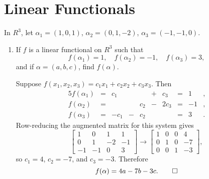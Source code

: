 \section{Linear Functionals}

 In $R^3$, let $\alpha_1 = (1, 0, 1)$,
$\alpha_2 = (0, 1, -2)$, $\alpha_3 = (-1, -1, 0)$.
\begin{enumerate}
\item If $f$ is a linear functional on $R^3$ such that
  \begin{equation*}
    f(\alpha_1) = 1, \quad
    f(\alpha_2) = -1, \quad
    f(\alpha_3) = 3,
  \end{equation*}
  and if $\alpha = (a, b, c)$, find $f(\alpha)$.
  \begin{solution}
    Suppose $f(x_1,x_2,x_3) = c_1x_1 + c_2x_2 + c_3x_3$. Then
    \begin{alignat*}{5}
      f(\alpha_1)
      &{}={}& c_1 && &{}+{}& c_3 &{}={}& 1 &, \\
      f(\alpha_2)
      &{}={}& && c_2 &{}-{}& 2c_3 &{}={}& -1 &, \\
      f(\alpha_3)
      &{}={}& -c_1 &{}-{}& c_2 && &{}={}& 3 &.
    \end{alignat*}
    Row-reducing the augmented matrix for this system gives
    \begin{equation*}
      \begin{bmatrix}
        1 & 0 & 1 & 1 \\
        0 & 1 & -2 & -1 \\
        -1 & -1 & 0 & 3
      \end{bmatrix}
      \rightarrow
      \begin{bmatrix}
        1 & 0 & 0 & 4 \\
        0 & 1 & 0 & -7 \\
        0 & 0 & 1 & -3
      \end{bmatrix},
    \end{equation*}
    so $c_1 = 4$, $c_2 = -7$, and $c_3 = -3$. Therefore
    \begin{equation*}
      f(\alpha) = 4a - 7b - 3c. \qedhere
    \end{equation*}
  \end{solution}


\end{enumerate}
